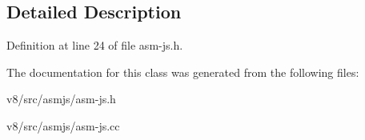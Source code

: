 \subsection{Detailed Description}


Definition at line 24 of file asm-\/js.\+h.



The documentation for this class was generated from the following files\+:\begin{DoxyCompactItemize}
\item 
v8/src/asmjs/asm-\/js.\+h\item 
v8/src/asmjs/asm-\/js.\+cc\end{DoxyCompactItemize}
